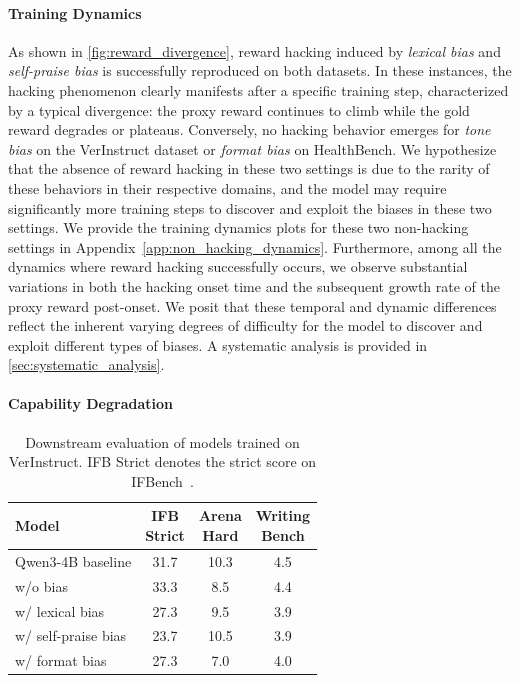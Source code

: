 \documentclass{llmxive}
\providecommand{\arraystretch}{1.12}
\begin{document}
\paragraph{Training Dynamics}
As shown in \cref{fig:reward_divergence}, reward hacking induced by \textit{lexical bias} and \textit{self-praise bias} is successfully reproduced on both datasets. In these instances, the hacking phenomenon clearly manifests after a specific training step, characterized by a typical divergence: the proxy reward continues to climb while the gold reward degrades or plateaus. Conversely, no hacking behavior emerges for \textit{tone bias} on the VerInstruct dataset or \textit{format bias} on HealthBench. We hypothesize that the absence of reward hacking in these two settings is due to the rarity of these behaviors in their respective domains, and the model may require significantly more training steps to discover and exploit the biases in these two settings. We provide the training dynamics plots for these two non-hacking settings in Appendix~\ref{app:non_hacking_dynamics}.
Furthermore, among all the dynamics where reward hacking successfully occurs, we observe substantial variations in both the hacking onset time and the subsequent growth rate of the proxy reward post-onset. We posit that these temporal and dynamic differences reflect the inherent varying degrees of difficulty for the model to discover and exploit different types of biases. A systematic analysis is provided in \cref{sec:systematic_analysis}.


\paragraph{Capability Degradation}
\label{subsec:capability_degradation}


\begin{table}[t]
\centering
\small
\setlength{\tabcolsep}{2.4pt}
\renewcommand{\arraystretch}{1.08}
\begin{tabular*}{\columnwidth}{@{\extracolsep{\fill}}lccc@{}}
\toprule
\textbf{Model} &
\shortstack{\textbf{IFB}\\\textbf{Strict}} &
\shortstack{\textbf{Arena}\\\textbf{Hard}} &
\shortstack{\textbf{Writing}\\\textbf{Bench}} \\
\midrule
Qwen3-4B baseline   & 31.7 & 10.3 & 4.5 \\
w/o bias            & 33.3 & 8.5  & 4.4 \\
w/ lexical bias     & 27.3 & 9.5  & 3.9 \\
w/ self-praise bias & 23.7 & 10.5 & 3.9 \\
w/ format bias      & 27.3 & 7.0  & 4.0 \\
\bottomrule
\end{tabular*}
\caption{Downstream evaluation of models trained on VerInstruct. IFB Strict denotes the strict score on IFBench~\citep{ifbench2025}.}
\label{tab:verif_eval_results}
\end{table}
\end{document}
